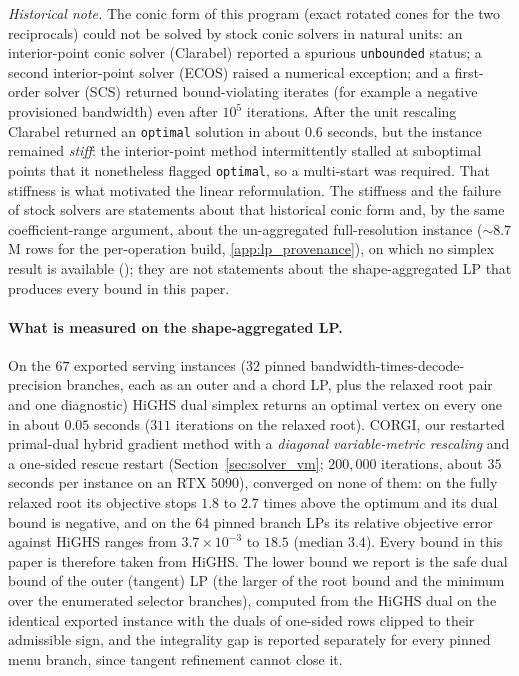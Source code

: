 \emph{Historical note.} The conic form of this program (exact rotated cones for
the two reciprocals) could not be solved by stock conic solvers in natural
units: an interior-point conic solver (Clarabel) reported a spurious
\texttt{unbounded} status; a second interior-point solver (ECOS) raised a
numerical exception; and a first-order solver (SCS) returned bound-violating
iterates (for example a negative provisioned bandwidth) even after $10^{5}$
iterations. After the unit rescaling Clarabel returned an \texttt{optimal}
solution in about $0.6$ seconds, but the instance remained \emph{stiff}: the
interior-point method intermittently stalled at suboptimal points that it
nonetheless flagged \texttt{optimal}, so a multi-start was required. That
stiffness is what motivated the linear reformulation. The stiffness and the
failure of stock solvers are statements about that historical conic form and,
by the same coefficient-range argument, about the un-aggregated full-resolution
instance (${\sim}8.7$M rows for the per-operation build,
\cref{app:lp_provenance}), on which no simplex result is available
(); they are
not statements about the shape-aggregated LP that produces every bound in this
paper.

\paragraph{What is measured on the shape-aggregated LP.}
On the $67$ exported serving instances ($32$ pinned bandwidth-times-decode-precision
branches, each as an outer and a chord LP, plus the relaxed root pair and one
diagnostic) HiGHS dual simplex returns an optimal vertex on every one in about
$0.05$ seconds ($311$ iterations on the relaxed root). CORGI, our restarted
primal-dual hybrid gradient method with a \emph{diagonal variable-metric
rescaling} and a one-sided rescue restart (Section~\ref{sec:solver_vm}; $200{,}000$
iterations, about $35$ seconds per instance on an RTX 5090), converged on none
of them: on the fully relaxed root its objective stops $1.8$ to $2.7$ times above
the optimum and its dual bound is negative, and on the $64$ pinned branch LPs
its relative objective error against HiGHS ranges from $3.7\times10^{-3}$ to
$18.5$ (median $3.4$). Every bound in this paper is therefore taken from HiGHS.
The lower bound we report is the safe dual bound of the outer (tangent) LP (the
larger of the root bound and the minimum over the enumerated selector
branches), computed from the HiGHS dual on the identical exported instance with
the duals of one-sided rows clipped to their admissible sign, and the
integrality gap is reported separately for every pinned menu branch, since
tangent refinement cannot close it.

